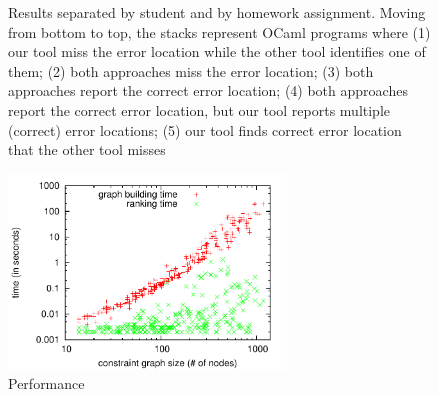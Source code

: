 \begin{figure}
\begin{center}
%
\end{center}
\caption{Results separated by student and by homework assignment.
Moving from bottom to top, the stacks represent OCaml programs where
%
(1) our tool miss the error location while the other tool identifies
one of them; 
%
(2) both approaches miss the error location; 
%
(3) both approaches report the correct error location; 
%
(4) both approaches report the correct error location, but our tool
reports multiple (correct) error locations; 
%
(5) our tool finds correct error location that the other tool misses} 
\label{fig:ocamlresult}
\end{figure}

\begin{figure}
\begin{center}
\includegraphics[height=14em]{graph/ocaml-performance}
\end{center}
\caption{Performance} 
\label{fig:performance}
\end{figure}

